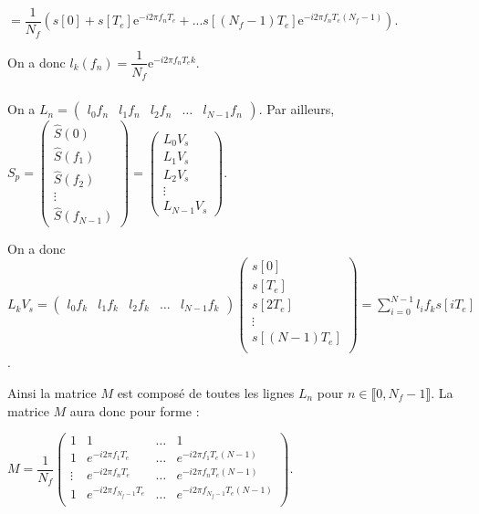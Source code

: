 \documentclass[10pt,fleqn]{article} %
\begin{document}
$= \dfrac{1}{N_f} \left(
 s\left[0\right] + 
 s\left[T_e\right] \text{e}^{-i 2 \pi f_nT_e } + ... 
 s\left[\left( N_f-1\right)T_e\right] \text{e}^{-i 2 \pi f_nT_e \left( N_f-1\right)}\right)$.
 
 On a donc $l_k\left(f_n\right)=\dfrac{1}{N_f}\text{e}^{-i 2 \pi f_nT_e k}$.
 

\subparagraph{} %

On a $L_n = \begin{pmatrix}  l_0 f_n  & l_1 f_n & l_2 f_n & \ldots & l_{N-1} f_n\end{pmatrix}$.
Par ailleurs, 
$S_p = 
\begin{pmatrix} \hat{S}\left( 0\right) \\ \hat{S}\left( f_1\right) \\ \hat{S}\left( f_2\right)  \\ \vdots \\ \hat{S}\left( f_{N-1}\right) \end{pmatrix} 
=
\begin{pmatrix} 
L_0 V_s \\
L_1 V_s \\
L_2 V_s \\
\vdots \\
 L_{N-1} V_s\end{pmatrix}$.

On a donc $ L_{k} V_s =\begin{pmatrix}  l_0 f_k  & l_1 f_k & l_2 f_k & \ldots & l_{N-1} f_k\end{pmatrix} \begin{pmatrix}
s[0]  \\ s[T_e] \\ s[2T_e] \\ \vdots \\ s\left[\left(N-1\right)T_e\right] \\   \end{pmatrix} = \sum  \limits_{i=0}^{N-1} l_i f_k s\left[i T_e\right]$.


Ainsi la matrice $M$ est composé de toutes les lignes $L_n$ pour $n\in  \llbracket 0,N_f-1\rrbracket$.
La matrice $M$ aura donc pour forme : 

$
M=\dfrac{1}{N_f}
\left(
\begin{array}{cccc}
1 & 1 & \ldots & 1 \\ 
1 & e^{-i2\pi f_1T_e} & \ldots & e^{-i2\pi f_{1}T_e(N-1)} \\ 
\vdots & e^{-i2\pi f_nT_e} & \ldots & e^{-i2\pi f_{n}T_e(N-1)} \\ 
1 & e^{-i2\pi f_{N_f-1}T_e} & \ldots & e^{-i2\pi f_{N_f-1}T_e(N-1)} \\ 
\end{array} 
\right)
$.
\end{document}
